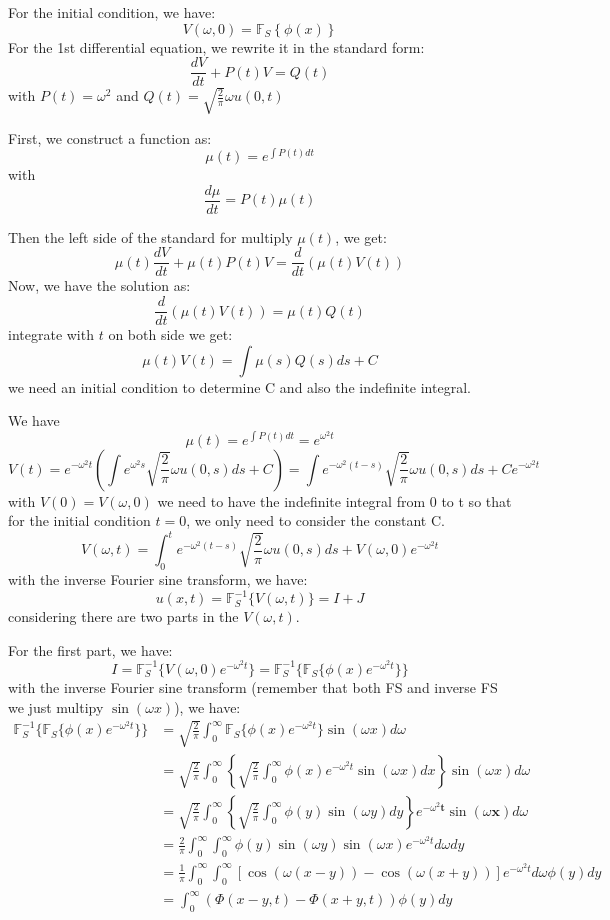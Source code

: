 \documentclass[12pt]{article} %
\begin{document}
For the initial condition, we have:
$$
V(\omega, 0) = \mathbb{F}_{S} \left \{  \phi(x) \right \}
$$
For the 1st differential equation, we rewrite it in the standard form:
$$
\frac{dV}{dt} + P(t)V =Q(t)
$$with $P(t) = \omega^2$ and $Q(t) = \sqrt{\frac{2}{\pi}} \omega u(0, t)$\par 
First, we construct a function as:
$$
\mu(t) = e^{\int P(t) dt}
$$with
$$
\frac{d \mu}{d t} = P(t) \mu(t)
$$\par
Then the left side of the standard for multiply $\mu(t)$, we get:
$$
\mu (t) \frac{dV}{dt} + \mu (t)P(t)V = \frac{d}{dt} \left( \mu(t) V(t) \right)
$$Now, we have the solution as:
$$
\frac{d}{dt} \left( \mu(t) V(t) \right) = \mu(t) Q(t)
$$integrate with $t$ on both side we get:
$$
 \mu(t) V(t) = \int \mu(s) Q(s) ds +C
$$ we need an initial condition to determine C and also the indefinite integral. \par
We have
$$
 \mu(t) = e^{\int P(t) dt} = e^{\omega^2 t}
$$
$$
V(t) = e^{- \omega^2 t} (\int e^{\omega^2 s} \sqrt{\frac{2}{\pi}} \omega u(0, s) ds +C )=  \int e^{-\omega^2 (t-s)} \sqrt{\frac{2}{\pi}} \omega u(0, s) ds +Ce^{- \omega^2 t}
$$with $V(0) = V(\omega, 0)$ we need to have the indefinite integral from 0 to t so that for the initial condition $t=0$, we only need to consider the constant C. 
$$
V(\omega,t) = \int_{0}^{t} e^{-\omega^2 (t-s)} \sqrt{\frac{2}{\pi}} \omega u(0, s) ds +V(\omega, 0)e^{- \omega^2 t}
$$
with the inverse Fourier sine transform, we have:
$$
u(x, t) = \mathbb{F}_{S}^{-1} \{ V(\omega, t)\} = I + J
$$considering there are two parts in the $V(\omega, t)$. \par
For the first part, we have:
$$
I = \mathbb{F}_{S}^{-1}  \{V(\omega, 0)e^{- \omega^2 t}  \}= \mathbb{F}_{S}^{-1}  \{ \mathbb{F}_{S}\{ \phi(x)e^{- \omega^2 t}  \} \}
$$with the inverse Fourier sine transform (remember that both FS and inverse FS we just multipy $\sin(\omega x)$), we have:
\begin{align*}
\mathbb{F}_{S}^{-1}  \{ \mathbb{F}_{S}\{ \phi(x)e^{- \omega^2 t}  \} \} & =  \sqrt{\frac{2}{\pi}} \int_{0}^{\infty}  \mathbb{F}_{S}\{ \phi(x)e^{- \omega^2 t} \} \sin (\omega x) d \omega \\
&= \sqrt{\frac{2}{\pi}} \int_{0}^{\infty}  \left\{ \sqrt{\frac{2}{\pi}} \int_{0}^{\infty} \phi(x)e^{- \omega^2 t} \sin(\omega x) dx   \right\} \sin (\omega x) d \omega \\
& =  \sqrt{\frac{2}{\pi}} \int_{0}^{\infty}  \left\{ \sqrt{\frac{2}{\pi}} \int_{0}^{\infty} \phi(y) \sin(\omega y) dy   \right\}e^{- \omega^2 \textbf{t}} \sin (\omega \textbf{x}) d \omega \\
& = \frac{2}{\pi}  \int_{0}^{\infty} \int_{0}^{\infty} \phi(y) \sin(\omega y) \sin (\omega x) e^{- \omega^2 t}  d\omega dy \\
& = \frac{1}{\pi} \int_{0}^{\infty} \int_{0}^{\infty} \left[ \cos(\omega (x - y)) - \cos(\omega (x + y))  \right] e^{- \omega^2 t}  d\omega  \phi(y) dy \\
& = \int_{0}^{\infty} \left( \Phi (x-y, t) - \Phi(x+y, t) \right) \phi(y)dy
\end{align*}
\end{document}
